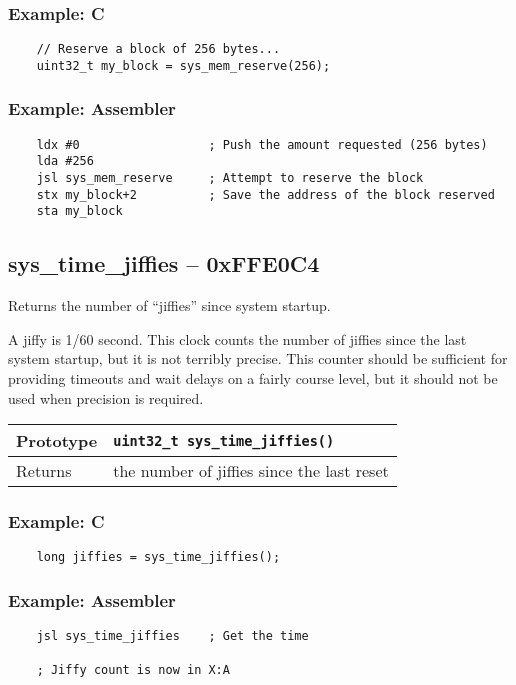 \subsubsection*{Example: C}
\begin{lstlisting}
    // Reserve a block of 256 bytes...
    uint32_t my_block = sys_mem_reserve(256);    
\end{lstlisting}

\subsubsection*{Example: Assembler}
\begin{verbatim}
    ldx #0                  ; Push the amount requested (256 bytes)
    lda #256
    jsl sys_mem_reserve     ; Attempt to reserve the block
    stx my_block+2          ; Save the address of the block reserved
    sta my_block
\end{verbatim}

\subsection*{sys\_time\_jiffies -- 0xFFE0C4}
Returns the number of ``jiffies'' since system startup.

A jiffy is 1/60 second. This clock counts the number of jiffies since the last system startup, but it is not terribly precise. This counter should be sufficient for providing timeouts and wait delays on a fairly course level, but it should not be used when precision is required.

\bigskip

\begin{tabular}{|l||l|} \hline
Prototype & \lstinline!uint32_t sys_time_jiffies()! \\ \hline
Returns & the number of jiffies since the last reset \\ \hline
\end{tabular}

\subsubsection*{Example: C}
\begin{lstlisting}
    long jiffies = sys_time_jiffies();
\end{lstlisting}

\subsubsection*{Example: Assembler}
\begin{verbatim}
    jsl sys_time_jiffies    ; Get the time

    ; Jiffy count is now in X:A
\end{verbatim}

